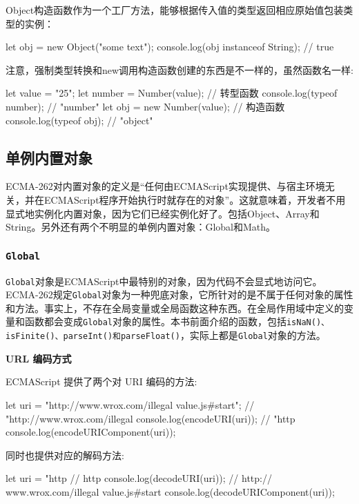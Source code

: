 Object构造函数作为一个工厂方法，能够根据传入值的类型返回相应原始值包装类型的实例：

\begin{JavaScript}
let obj = new Object("some text"); 
console.log(obj instanceof String);  // true 
\end{JavaScript}

注意，强制类型转换和new调用构造函数创建的东西是不一样的，虽然函数名一样:

\begin{JavaScript}
let value = "25"; 
let number = Number(value);    // 转型函数
console.log(typeof number);    // "number" 
let obj = new Number(value);   // 构造函数
console.log(typeof obj);       // "object"
\end{JavaScript}

\subsection{单例内置对象}

ECMA-262对内置对象的定义是“任何由ECMAScript实现提供、与宿主环境无关，并在ECMAScript程序开始执行时就存在的对象”。这就意味着，开发者不用显式地实例化内置对象，因为它们已经实例化好了。包括Object、Array和String。另外还有两个不明显的单例内置对象：Global和Math。

\subsubsection{\texttt{Global}}

\texttt{Global}对象是ECMAScript中最特别的对象，因为代码不会显式地访问它。ECMA-262规定\texttt{Global}对象为一种兜底对象，它所针对的是不属于任何对象的属性和方法。事实上，不存在全局变量或全局函数这种东西。在全局作用域中定义的变量和函数都会变成\texttt{Global}对象的属性。本书前面介绍的函数，包括\texttt{isNaN()、isFinite()、parseInt()和parseFloat()}，实际上都是\texttt{Global}对象的方法。

\noindent\textbf{URL 编码方式}

ECMAScript 提供了两个对 URI 编码的方法:
\begin{JavaScript}
let uri = "http://www.wrox.com/illegal value.js#start"; 
// "http://www.wrox.com/illegal%
console.log(encodeURI(uri)); 
// "http%
console.log(encodeURIComponent(uri)); 
\end{JavaScript}

同时也提供对应的解码方法:
\begin{JavaScript}
let uri = "http%
// http%
console.log(decodeURI(uri)); 
// http:// www.wrox.com/illegal value.js#start 
console.log(decodeURIComponent(uri)); 
\end{JavaScript}

